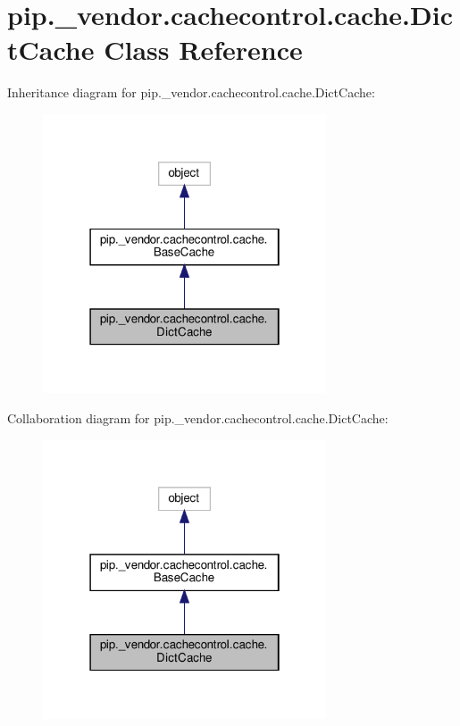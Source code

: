 \hypertarget{classpip_1_1__vendor_1_1cachecontrol_1_1cache_1_1DictCache}{}\section{pip.\+\_\+vendor.\+cachecontrol.\+cache.\+Dict\+Cache Class Reference}
\label{classpip_1_1__vendor_1_1cachecontrol_1_1cache_1_1DictCache}


Inheritance diagram for pip.\+\_\+vendor.\+cachecontrol.\+cache.\+Dict\+Cache\+:
\nopagebreak
\begin{figure}[H]
\begin{center}
\leavevmode
\includegraphics[width=238pt]{classpip_1_1__vendor_1_1cachecontrol_1_1cache_1_1DictCache__inherit__graph}
\end{center}
\end{figure}


Collaboration diagram for pip.\+\_\+vendor.\+cachecontrol.\+cache.\+Dict\+Cache\+:
\nopagebreak
\begin{figure}[H]
\begin{center}
\leavevmode
\includegraphics[width=238pt]{classpip_1_1__vendor_1_1cachecontrol_1_1cache_1_1DictCache__coll__graph}
\end{center}
\end{figure}
